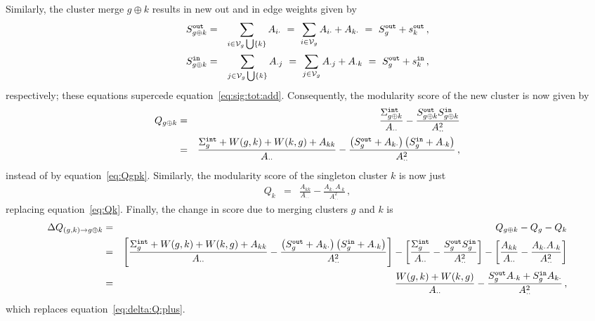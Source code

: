 \documentclass[a4paper]{article}
\begin{document}
Similarly, the cluster merge $g\oplus k$ results in new out and in edge weights given by
\begin{eqnarray}
    S_{g\oplus k}^{\tt out} & = & \sum_{i\in{\cal V}_g\bigcup\{k\}} A_{i\cdot}
~=~
    \sum_{i\in{\cal V}_g} A_{i\cdot}+A_{k\cdot}
    ~=~S_{g}^{\tt out}+s^{\tt out}_k\,,
\label{eq:S:g:k:out}
\\
    S_{g\oplus k}^{\tt in} & = & \sum_{j\in{\cal V}_g\bigcup\{k\}} A_{\cdot j}
~=~
    \sum_{j\in{\cal V}_g} A_{\cdot j}+A_{\cdot k}
    ~=~S_{g}^{\tt out}+s^{\tt in}_k\,,
\label{eq:S:g:k:in}
\end{eqnarray}
respectively; these equations supercede equation~\eqref{eq:sig:tot:add}.
Consequently, the modularity score of the new cluster is now given by
\begin{eqnarray}
Q_{g\oplus k} & = & 
\frac{\Sigma_{g\oplus k}^{\tt int}}{A_{\cdot\cdot}}
    -\frac{S_{g\oplus k}^{\tt out}S_{g\oplus k}^{\tt in}}{A_{\cdot\cdot}^2}
\nonumber\\& = &
\frac{\Sigma_{g}^{\tt int}+W(g,k)+W(k,g)+A_{kk}}{A_{\cdot\cdot}}
    -\frac{\left(S_{g}^{\tt out}+A_{k\cdot}\right)\left(S_{g}^{\tt in}+A_{\cdot k}\right)}{A_{\cdot\cdot}^2}\,,
\end{eqnarray}
instead of by equation~\eqref{eq:Qgpk}.
Similarly, the modularity score of the singleton cluster $k$ is now just
\begin{eqnarray}
    Q_k & = & \frac{A_{kk}}{A_{\cdot\cdot}}
    -\frac{A_{k\cdot}A_{\cdot k}}{A_{\cdot\cdot}^2}\,,
\end{eqnarray}
replacing equation~\eqref{eq:Qk}.
Finally, the change in score due to merging clusters $g$ and $k$ is
\begin{eqnarray}
    \Delta Q_{(g,k)\rightarrow g\oplus k} & = & Q_{g\oplus k}-Q_g-Q_k
\nonumber\\&=&
    \left[\frac{\Sigma_{g}^{\tt int}+W(g,k)+W(k,g)+A_{kk}}{A_{\cdot\cdot}}
    -\frac{\left(S_{g}^{\tt out}+A_{k\cdot}\right)\left(S_{g}^{\tt in}+A_{\cdot k}\right)}{A_{\cdot\cdot}^2}\right]
-\left[\frac{\Sigma_{g}^{\tt int}}{A_{\cdot\cdot}}
    -\frac{S_{g}^{\tt out}S_{g}^{\tt in}}{A_{\cdot\cdot}^2}\right]
    -\left[\frac{A_{kk}}{A_{\cdot\cdot}}
    -\frac{A_{k\cdot}A_{\cdot k}}{A_{\cdot\cdot}^2}\right]
\nonumber\\&=&
    \frac{W(g,k)+W(k,g)}{A_{\cdot\cdot}}-\frac{S_g^{\tt out}A_{\cdot k}+S_g^{\tt in}A_{k\cdot}}{A_{\cdot\cdot}^2}\,,
\end{eqnarray}
which replaces equation~\eqref{eq:delta:Q:plus}.
\end{document}
